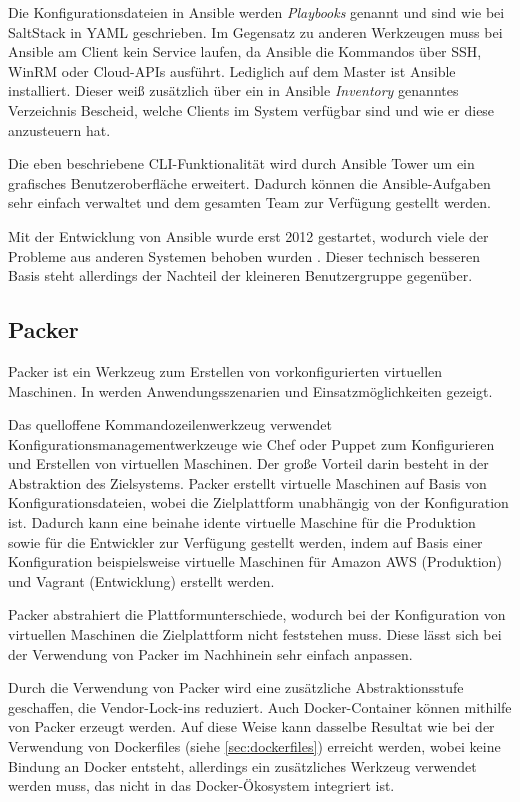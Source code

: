 Die Konfigurationsdateien in Ansible werden \emph{Playbooks} genannt und sind wie bei SaltStack in YAML geschrieben.
Im Gegensatz zu anderen Werkzeugen muss bei Ansible am Client kein Service laufen, da Ansible die Kommandos über SSH, WinRM oder Cloud-APIs ausführt.
Lediglich auf dem Master ist Ansible installiert.
Dieser weiß zusätzlich über ein in Ansible \emph{Inventory} genanntes Verzeichnis Bescheid, welche Clients im System verfügbar sind und wie er diese anzusteuern hat.

Die eben beschriebene CLI-Funktionalität wird durch Ansible Tower um ein grafisches Benutzeroberfläche erweitert.
Dadurch können die Ansible-Aufgaben sehr einfach verwaltet und dem gesamten Team zur Verfügung gestellt werden.

Mit der Entwicklung von Ansible wurde erst 2012 gestartet, wodurch viele der Probleme aus anderen Systemen behoben wurden \autocite{Wolff201604}. Dieser technisch besseren Basis steht allerdings der Nachteil der kleineren Benutzergruppe gegenüber.

\subsection{Packer}
\label{sub:packer}
Packer ist ein Werkzeug zum Erstellen von vorkonfigurierten virtuellen Maschinen.
In \autocite{Packer:online} werden Anwendungsszenarien und Einsatzmöglichkeiten gezeigt.

Das quelloffene Kommandozeilenwerkzeug verwendet Konfigurationsmanagementwerkzeuge wie Chef oder Puppet zum Konfigurieren und Erstellen von virtuellen Maschinen.
Der große Vorteil darin besteht in der Abstraktion des Zielsystems.
Packer erstellt virtuelle Maschinen auf Basis von Konfigurationsdateien, wobei die Zielplattform unabhängig von der Konfiguration ist.
Dadurch kann eine beinahe idente virtuelle Maschine für die Produktion sowie für die Entwickler zur Verfügung gestellt werden, indem auf Basis einer Konfiguration beispielsweise virtuelle Maschinen für Amazon AWS (Produktion) und Vagrant (Entwicklung) erstellt werden.

Packer abstrahiert die Plattformunterschiede, wodurch bei der Konfiguration von virtuellen Maschinen die Zielplattform nicht feststehen muss.
Diese lässt sich bei der Verwendung von Packer im Nachhinein sehr einfach anpassen.

Durch die Verwendung von Packer wird eine zusätzliche Abstraktionsstufe geschaffen, die Vendor-Lock-ins reduziert.
Auch Docker-Container können mithilfe von Packer erzeugt werden.
Auf diese Weise kann dasselbe Resultat wie bei der Verwendung von Dockerfiles (siehe \cref{sec:dockerfiles}) erreicht werden, wobei keine Bindung an Docker entsteht, allerdings ein zusätzliches Werkzeug verwendet werden muss, das nicht in das Docker-Ökosystem integriert ist.


